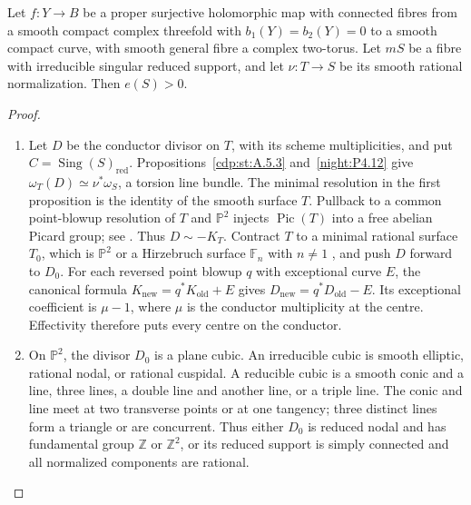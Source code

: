\begin{proposition}\hypertarget{tag-02WT}{}\label{night:P4.21}\label{stmt:P4.21}

Let $f:Y\to B$ be a proper surjective holomorphic map with connected
fibres from a smooth compact complex threefold with $b_1(Y)=b_2(Y)=0$
to a smooth compact curve, with smooth general fibre a complex two-torus.
Let $mS$ be a fibre with irreducible singular reduced support, and let
$\nu:T\to S$ be its smooth rational normalization. Then $e(S)>0$.
\end{proposition}
\begin{proof}

\begin{enumerate}[label={$\langle1\rangle$\arabic*.},leftmargin=*]
\item Let $D$ be the conductor divisor on $T$, with its scheme
multiplicities, and put $C=\operatorname{Sing}(S)_{\mathrm{red}}$.
Propositions~\ref{cdp:st:A.5.3} and~\ref{night:P4.12} give
$\omega_T(D)\simeq\nu^*\omega_S$, a torsion line bundle.
The minimal resolution in the first proposition is the identity of the
smooth surface $T$. Pullback to a common point-blowup resolution of
$T$ and $\mathbb P^2$ injects $\operatorname{Pic}(T)$ into a free
abelian Picard group; see \cite[II.3, pp.~17--18; II.12, p.~24]{Beauville1978}.
Thus $D\sim-K_T$. Contract $T$ to a minimal rational surface $T_0$,
which is $\mathbb P^2$ or a Hirzebruch surface $\mathbb F_n$ with
$n\ne1$ \cite[V.10, pp.~79--80]{Beauville1978}, and push $D$ forward
to $D_0$. For each reversed point blowup $q$ with exceptional curve $E$,
the canonical formula $K_{\mathrm{new}}=q^*K_{\mathrm{old}}+E$
gives $D_{\mathrm{new}}=q^*D_{\mathrm{old}}-E$.
Its exceptional coefficient is $\mu-1$, where $\mu$ is the
conductor multiplicity at the centre. Effectivity therefore puts
every centre on the conductor.

\item On $\mathbb P^2$, the divisor $D_0$ is a plane cubic. An
irreducible cubic is smooth elliptic, rational nodal, or
rational cuspidal. A reducible cubic is a smooth conic
and a line, three lines, a double line and another line,
or a triple line. The conic and line meet at two
transverse points or at one tangency; three distinct
lines form a triangle or are concurrent. Thus either
$D_0$ is reduced nodal and has fundamental group
$\mathbb Z$ or $\mathbb Z^2$, or its reduced support is
simply connected and all normalized components are
rational.


\end{enumerate}
\end{proof}
